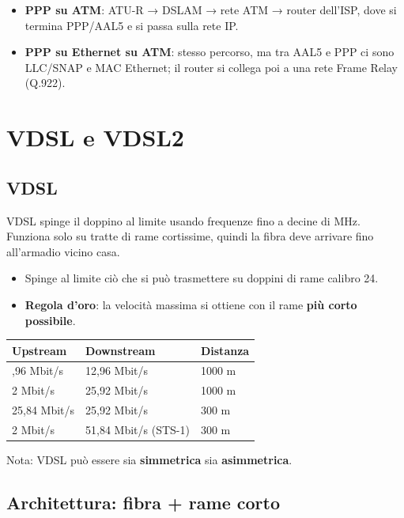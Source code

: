 \begin{itemize}
\tightlist
\item
  \textbf{PPP su ATM}: ATU-R → DSLAM → rete ATM → router dell'ISP, dove si termina PPP/AAL5 e si passa sulla rete IP.
\item
  \textbf{PPP su Ethernet su ATM}: stesso percorso, ma tra AAL5 e PPP ci sono LLC/SNAP e MAC Ethernet; il router si collega poi a una rete Frame Relay (Q.922).
\end{itemize}

\section{VDSL e VDSL2}

\subsection{VDSL}

\begin{inbreve}

VDSL spinge il doppino al limite usando frequenze fino a decine di MHz. Funziona solo su tratte di rame cortissime, quindi la fibra deve arrivare fino all'armadio vicino casa.

\end{inbreve}

\begin{itemize}
\tightlist
\item
  Spinge al limite ciò che si può trasmettere su doppini di rame calibro 24.
\item
  \textbf{Regola d'oro}: la velocità massima si ottiene con il rame \textbf{più corto possibile}.
\end{itemize}

\begin{longtable}[]{@{}lll@{}}
\toprule\noalign{}
Upstream & Downstream & Distanza \\
\midrule\noalign{}
\endhead
\bottomrule\noalign{}
\endlastfoot
12,96 Mbit/s & 12,96 Mbit/s & 1000 m \\
2 Mbit/s & 25,92 Mbit/s & 1000 m \\
25,84 Mbit/s & 25,92 Mbit/s & 300 m \\
2 Mbit/s & 51,84 Mbit/s (STS-1) & 300 m \\
\end{longtable}

Nota: VDSL può essere sia \textbf{simmetrica} sia \textbf{asimmetrica}.

\subsection{Architettura: fibra + rame corto}

